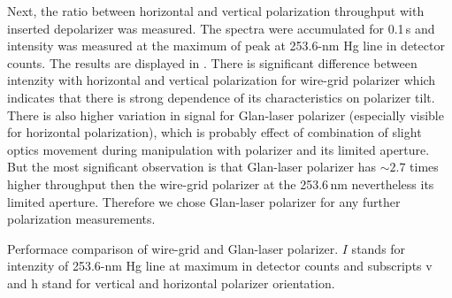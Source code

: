 Next, the ratio between horizontal and vertical polarization throughput with
inserted depolarizer was measured. The spectra were accumulated for 0.1\,s
and intensity was measured at the maximum of peak at 253.6-nm Hg line in
detector counts. The results are displayed in
.
There is significant difference between intenzity with horizontal and vertical
polarization for wire-grid polarizer which indicates that there is strong
dependence of its characteristics on polarizer tilt. There is also higher
variation in signal for Glan-laser polarizer (especially visible for
horizontal polarization), which is probably effect of combination of slight
optics movement during manipulation with polarizer and its limited aperture.
But the most significant observation is that Glan-laser polarizer has
$\sim 2.7$ times higher throughput then the wire-grid polarizer at the
253.6\,nm nevertheless its limited aperture. Therefore we chose Glan-laser
polarizer for any further polarization measurements.

\begin{table}
	\centering
	
	\caption{Performace comparison of wire-grid and Glan-laser polarizer. $I$
	stands for intenzity of 253.6-nm Hg line at maximum in detector counts and
	subscripts v and h stand for vertical and horizontal polarizer orientation.}
	\label{\tablabel{polarized_measurements:polarizer_evaluation}}
\end{table}
